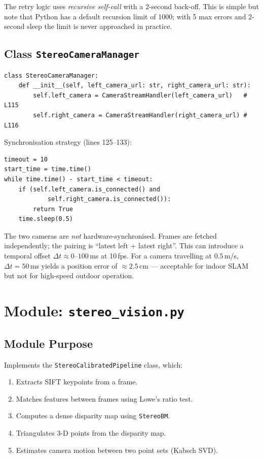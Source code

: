 \documentclass[12pt,a4paper,twoside]{report}
\theoremstyle{definition}
\newcommand{\code}[1]{\texttt{#1}}
\begin{document}
\noindent The retry logic uses \emph{recursive self-call} with a 2-second
back-off. This is simple but note that Python has a default recursion limit of
1000; with 5 max errors and 2-second sleep the limit is never approached in
practice.

\section{Class \texttt{StereoCameraManager}}

\begin{lstlisting}
class StereoCameraManager:
    def __init__(self, left_camera_url: str, right_camera_url: str):
        self.left_camera = CameraStreamHandler(left_camera_url)   # L115
        self.right_camera = CameraStreamHandler(right_camera_url) # L116
\end{lstlisting}

Synchronisation strategy (lines 125--133):
\begin{lstlisting}
timeout = 10
start_time = time.time()
while time.time() - start_time < timeout:
    if (self.left_camera.is_connected() and
            self.right_camera.is_connected()):
        return True
    time.sleep(0.5)
\end{lstlisting}

\begin{warnbox}
The two cameras are \emph{not} hardware-synchronised. Frames are fetched
independently; the pairing is ``latest left + latest right''. This can
introduce a temporal offset $\Delta t \approx 0$--$100$\,ms at 10\,fps.
For a camera travelling at $0.5$\,m/s, $\Delta t = 50$\,ms yields a
position error of $\approx 2.5$\,cm --- acceptable for indoor SLAM but
not for high-speed outdoor operation.
\end{warnbox}

\chapter{Module: \texttt{stereo\_vision.py}}

\section{Module Purpose}

Implements the \code{StereoCalibratedPipeline} class, which:
\begin{enumerate}
  \item Extracts SIFT keypoints from a frame.
  \item Matches features between frames using Lowe's ratio test.
  \item Computes a dense disparity map using \code{StereoBM}.
  \item Triangulates 3-D points from the disparity map.
  \item Estimates camera motion between two point sets (Kabsch SVD).
\end{enumerate}
\end{document}
